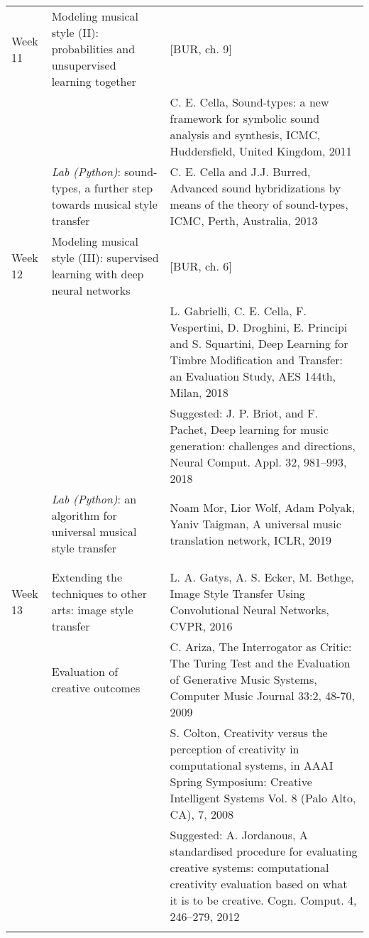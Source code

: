 \documentclass[letterpaper]{inzane_syllabus} %
\begin{document}
\begin{center}
\begin{tabularx}{\textwidth}{p{2cm}p{8cm} @{\hskip 0.5cm} p{9.5cm}}
Week 11 & Modeling musical style (II): probabilities and unsupervised learning together & [BUR, ch. 9] \\

& & C. E. Cella, Sound-types: a new framework for symbolic sound analysis and synthesis, ICMC, Huddersfield, United Kingdom, 2011 \\

&\emph{Lab (Python)}: sound-types, a further step towards musical style transfer & C. E. Cella and J.J. Burred, Advanced sound hybridizations by means of the theory of sound-types, ICMC, Perth, Australia, 2013 \\

\arrayrulecolor{maingray}\hline
Week 12 & Modeling musical style (III): supervised learning with deep neural networks &  [BUR, ch. 6] \\
& &  L. Gabrielli, C. E. Cella, F. Vespertini, D. Droghini, E. Principi and S. Squartini, Deep Learning for Timbre Modification and Transfer: an Evaluation Study, AES 144th, Milan, 2018 \\
& & Suggested: J. P. Briot, and F. Pachet, Deep learning for music generation: challenges and directions, Neural Comput. Appl. 32, 981–993, 2018 \\

&\emph{ Lab (Python)}: an algorithm for universal musical style transfer &   Noam Mor, Lior Wolf, Adam Polyak, Yaniv Taigman, A universal music translation network, ICLR, 2019 \\
& & \\ 

\arrayrulecolor{myCOLOR}\hline
\multicolumn{2}{l}{\textbf{\textcolor{myCOLOR}{\large MODULE 3: Connections}}} \\
\hline
\arrayrulecolor{maingray}\hline

Week 13 & Extending the techniques to other arts: image style transfer & L. A. Gatys, A. S. Ecker, M. Bethge, Image Style Transfer Using Convolutional Neural Networks, CVPR, 2016 \\ 
&Evaluation of creative outcomes & C. Ariza, The Interrogator as Critic: The Turing Test and the Evaluation of Generative Music Systems, Computer Music Journal 33:2, 48-70, 2009  \\
& & S. Colton, Creativity versus the perception of creativity in computational systems, in AAAI Spring Symposium: Creative Intelligent Systems Vol. 8 (Palo Alto, CA), 7, 2008 \\
& & Suggested: A. Jordanous, A standardised procedure for evaluating creative systems:
computational creativity evaluation based on what it is to be creative. Cogn. Comput. 4, 246–279, 2012 \\
\arrayrulecolor{maingray}\hline


\end{tabularx}
\end{center}
\end{document}
